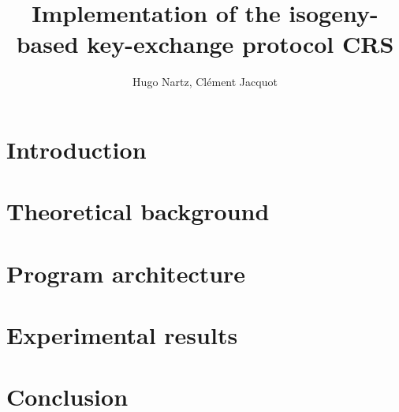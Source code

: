 \documentclass[12pt]{article}
\title{Implementation of the isogeny-based key-exchange protocol CRS}
\author{Hugo Nartz, Cl\'ement Jacquot}
\date{}
\begin{document}
\maketitle
\renewcommand{\contentsname}{Table of content}
\tableofcontents
\newpage

%

\section*{Introduction}


\section{Theoretical background}


\newpage
\section{Program architecture}


\newpage
\section{Experimental results}


\newpage
{}
\section*{Conclusion}


{}

\end{document}
